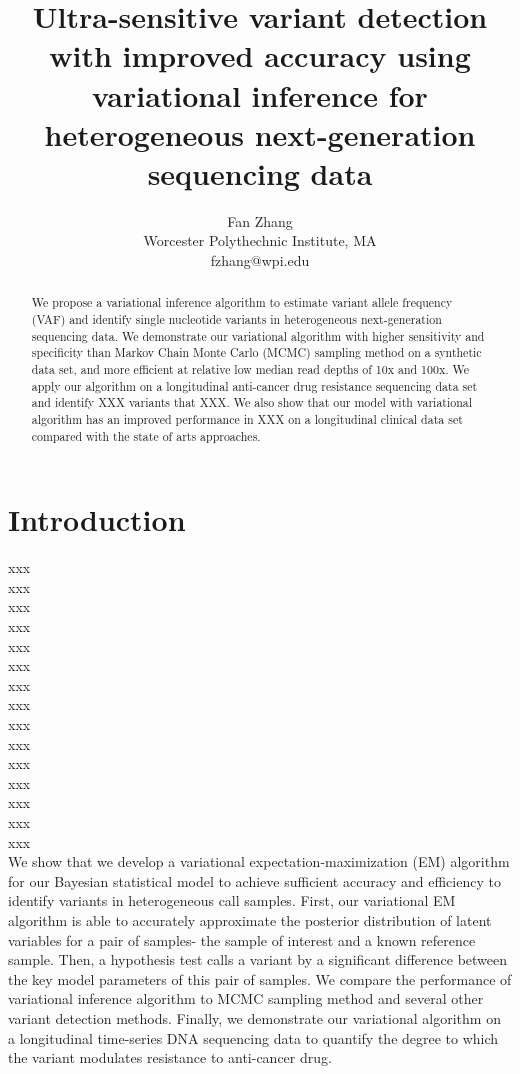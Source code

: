 \documentclass{article}
\title{Ultra-sensitive variant detection with improved accuracy using variational inference for heterogeneous next-generation sequencing data}
\author{Fan Zhang \\
Worcester Polythechnic Institute, MA  \\
fzhang@wpi.edu}
\begin{document}
\maketitle

\begin{abstract}
We propose a variational inference algorithm to estimate variant allele frequency (VAF) and identify single nucleotide variants in heterogeneous next-generation sequencing data.
We demonstrate our variational algorithm with higher sensitivity and specificity than Markov Chain Monte Carlo (MCMC) sampling method on a synthetic data set,
and more efficient at relative low median read depths of 10x and 100x.
We apply our algorithm on a longitudinal anti-cancer drug resistance sequencing data set and identify XXX variants that XXX.
We also show that our model with variational algorithm has an improved performance in XXX on a longitudinal clinical data set compared with the state of arts approaches.


\end{abstract}

\section{Introduction}
xxx\\
xxx\\
xxx\\
xxx\\
xxx\\
xxx\\
xxx\\
xxx\\
xxx\\
xxx\\
xxx\\
xxx\\
xxx\\
xxx\\
xxx\\

We show that we develop a variational expectation-maximization (EM) algorithm for our Bayesian statistical model to achieve sufficient accuracy and efficiency to identify variants in heterogeneous call samples. First, our variational EM algorithm is able to accurately approximate the posterior distribution of latent variables for a pair of samples- the sample of interest and a known reference sample. Then, a hypothesis test calls a variant by a significant difference between the key model parameters of this pair of samples. We compare the performance of variational inference algorithm to MCMC sampling method and several other variant detection methods. Finally, we demonstrate our variational algorithm on a longitudinal time-series DNA sequencing data to quantify the degree to which the variant modulates resistance to anti-cancer drug.
\end{document}
